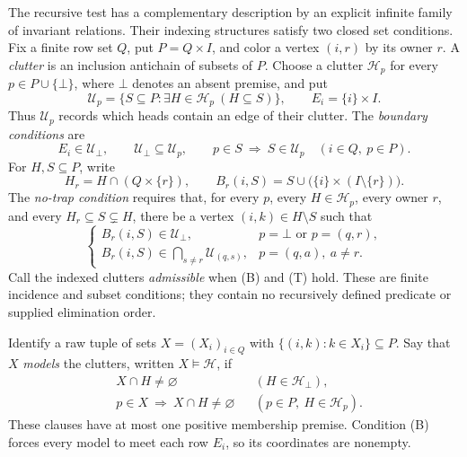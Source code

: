 The recursive test has a complementary description by an explicit infinite
family of invariant relations. Their indexing structures satisfy two closed
set conditions. Fix a finite row set $Q$, put $P=Q\times I$, and color a
vertex $(i,r)$ by its owner $r$. A \emph{clutter} is an inclusion antichain
of subsets of $P$. Choose a clutter $\mathcal H_p$ for every
$p\in P\cup\{\bot\}$, where $\bot$ denotes an absent premise, and put
\[
 \mathcal U_p=\{S\subseteq P:\exists H\in\mathcal H_p\ (H\subseteq S)\},
 \qquad E_i=\{i\}\times I.
\]
Thus $\mathcal U_p$ records which heads contain an edge of their clutter.
The \emph{boundary conditions} are
\begin{equation}\label{core:eq:hypergraph-boundary}
 \tag{B}
 E_i\in\mathcal U_\bot,\qquad
 \mathcal U_\bot\subseteq\mathcal U_p,\qquad
 p\in S\ \Longrightarrow\ S\in\mathcal U_p
 \quad(i\in Q,\ p\in P).
\end{equation}
For $H,S\subseteq P$, write
\[
 H_r=H\cap(Q\times\{r\}),\qquad
 B_r(i,S)=S\cup\bigl(\{i\}\times(I\setminus\{r\})\bigr).
\]
The \emph{no-trap condition} requires that, for every $p$, every
$H\in\mathcal H_p$, every owner $r$, and every
$H_r\subseteq S\subsetneq H$, there be a vertex $(i,k)\in H\setminus S$
such that
\begin{equation}\label{core:eq:hypergraph-no-trap}
 \tag{T}
 \begin{cases}
 B_r(i,S)\in\mathcal U_\bot,
   &p=\bot\text{ or }p=(q,r),\\
 B_r(i,S)\in\displaystyle\bigcap_{s\ne r}\mathcal U_{(q,s)},
   &p=(q,a),\ a\ne r.
 \end{cases}
\end{equation}
Call the indexed clutters \emph{admissible} when (B) and (T) hold.
These are finite incidence and subset conditions; they contain no
recursively defined predicate or supplied elimination order.

Identify a raw tuple of sets $X=(X_i)_{i\in Q}$ with
$\{(i,k):k\in X_i\}\subseteq P$. Say that $X$ \emph{models} the clutters,
written $X\models\mathcal H$, if
\begin{equation}\label{core:eq:hypergraph-models}
 \begin{aligned}
 &X\cap H\ne\varnothing&& (H\in\mathcal H_\bot),\\
 &p\in X\ \Longrightarrow\ X\cap H\ne\varnothing
   &&(p\in P,\ H\in\mathcal H_p).
 \end{aligned}
\end{equation}
These clauses have at most one positive membership premise. Condition (B)
forces every model to meet each row $E_i$, so its coordinates are nonempty.

